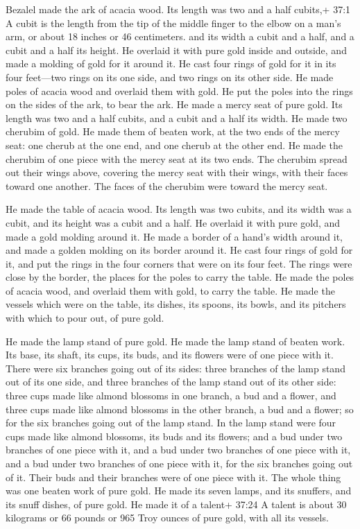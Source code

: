  Bezalel made the ark of acacia wood. Its length was two and
a half cubits,+ 37:1 A cubit is the length from the tip of the middle
finger to the elbow on a man's arm, or about 18 inches or 46
centimeters. and its width a cubit and a half, and a cubit and a half
its height.  He overlaid it with pure gold inside and
outside, and made a molding of gold for it around it.  He
cast four rings of gold for it in its four feet---two rings on its one
side, and two rings on its other side.  He made poles of
acacia wood and overlaid them with gold.  He put the poles
into the rings on the sides of the ark, to bear the ark.  He
made a mercy seat of pure gold. Its length was two and a half cubits,
and a cubit and a half its width.  He made two cherubim of
gold. He made them of beaten work, at the two ends of the mercy seat:
 one cherub at the one end, and one cherub at the other end.
He made the cherubim of one piece with the mercy seat at its two ends.
 The cherubim spread out their wings above, covering the
mercy seat with their wings, with their faces toward one another. The
faces of the cherubim were toward the mercy seat.

 He made the table of acacia wood. Its length was two
cubits, and its width was a cubit, and its height was a cubit and a
half.  He overlaid it with pure gold, and made a gold
molding around it.  He made a border of a hand's width
around it, and made a golden molding on its border around it.
 He cast four rings of gold for it, and put the rings in
the four corners that were on its four feet.  The rings
were close by the border, the places for the poles to carry the table.
 He made the poles of acacia wood, and overlaid them with
gold, to carry the table.  He made the vessels which were
on the table, its dishes, its spoons, its bowls, and its pitchers with
which to pour out, of pure gold.

 He made the lamp stand of pure gold. He made the lamp
stand of beaten work. Its base, its shaft, its cups, its buds, and its
flowers were of one piece with it.  There were six branches
going out of its sides: three branches of the lamp stand out of its one
side, and three branches of the lamp stand out of its other side:
 three cups made like almond blossoms in one branch, a bud
and a flower, and three cups made like almond blossoms in the other
branch, a bud and a flower; so for the six branches going out of the
lamp stand.  In the lamp stand were four cups made like
almond blossoms, its buds and its flowers;  and a bud under
two branches of one piece with it, and a bud under two branches of one
piece with it, and a bud under two branches of one piece with it, for
the six branches going out of it.  Their buds and their
branches were of one piece with it. The whole thing was one beaten work
of pure gold.  He made its seven lamps, and its snuffers,
and its snuff dishes, of pure gold.  He made it of a
talent+ 37:24 A talent is about 30 kilograms or 66 pounds or 965 Troy
ounces of pure gold, with all its vessels.

